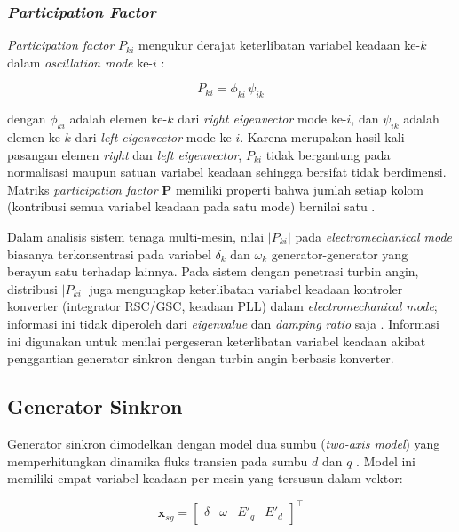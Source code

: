 \subsubsection{\textit{Participation Factor}}

\textit{Participation factor} $P_{ki}$ mengukur derajat keterlibatan variabel keadaan
ke-$k$ dalam \textit{oscillation mode} ke-$i$ \cite{kundur1994power}:

\begin{equation}
  P_{ki} = \phi_{ki}\,\psi_{ik}
  \label{eq:pf}
\end{equation}

dengan $\phi_{ki}$ adalah elemen ke-$k$ dari \textit{right eigenvector} mode ke-$i$,
dan $\psi_{ik}$ adalah elemen ke-$k$ dari \textit{left eigenvector} mode ke-$i$.
Karena merupakan hasil kali pasangan elemen \textit{right} dan \textit{left
eigenvector}, $P_{ki}$ tidak bergantung pada normalisasi maupun satuan variabel
keadaan sehingga bersifat tidak berdimensi. Matriks \textit{participation factor}
$\mathbf{P}$ memiliki properti bahwa jumlah setiap kolom (kontribusi semua variabel
keadaan pada satu mode) bernilai satu \cite{kundur1994power}.

Dalam analisis sistem tenaga multi-mesin, nilai $|P_{ki}|$ pada \textit{electromechanical mode}
biasanya terkonsentrasi pada variabel $\delta_k$ dan $\omega_k$ generator-generator
yang berayun satu terhadap lainnya. Pada sistem dengan penetrasi turbin angin,
distribusi $|P_{ki}|$ juga mengungkap keterlibatan variabel keadaan kontroler
konverter (integrator RSC/GSC, keadaan PLL) dalam \textit{electromechanical mode};
informasi ini tidak diperoleh dari \textit{eigenvalue} dan \textit{damping ratio}
saja \cite{kundur1994power}. Informasi ini digunakan untuk menilai pergeseran
keterlibatan variabel keadaan akibat penggantian generator sinkron dengan turbin
angin berbasis konverter.

\subsection{Generator Sinkron}

Generator sinkron dimodelkan dengan model dua sumbu (\textit{two-axis model}) yang
memperhitungkan dinamika fluks transien pada sumbu $d$ dan $q$ \cite{sauer2006power}.
Model ini memiliki empat variabel keadaan per mesin yang tersusun dalam vektor:

\begin{equation}
  \mathbf{x}_{sg} = \begin{bmatrix}\delta & \omega & E'_q & E'_d\end{bmatrix}^\top
  \label{eq:sg-statevec}
\end{equation}

